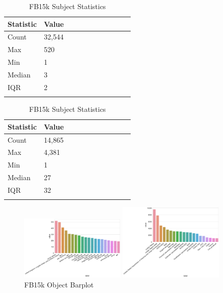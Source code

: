 \begin{table}[H]
	\parbox{.5\linewidth}{
		\centering
		\begin{tabular}{lllllllllll}
  			\textbf{Statistic} & \textbf{Value}  \\
  			\hline
			Count & 32,544 \\
			Max & 520 \\
			Min & 1 \\
  			Median & 3 \\
  			IQR & 2 \\
			&
		\end{tabular}
		\caption{WN18 Subject Statistics}
		}
	\hfill
	\parbox{.5\linewidth}{
		\centering
		\begin{tabular}{lllllllllll}
  			\textbf{Statistic} & \textbf{Value}  \\
  			\hline
			Count &14,865 \\
			Max & 4,381 \\
			Min & 1 \\
  			Median & 27 \\
  			IQR & 32 \\
			&
		\end{tabular}
		\caption{FB15k Subject Statistics}
		}
\end{table}


\begin{figure}[H]
	\parbox{.5\linewidth}{
   		\centering
    		\includegraphics[width=0.45\textwidth, height=0.2\textheight]{WN18_Object_Counts}
		\caption{WN18 Object Barplot}
		}
	\hfill
	\parbox{.5\linewidth}{
   		\centering
		\includegraphics[width=0.45\textwidth, height=0.2\textheight]{FB15k_Object_Counts}
		\caption{FB15k Object Barplot}
		}
\end{figure}

